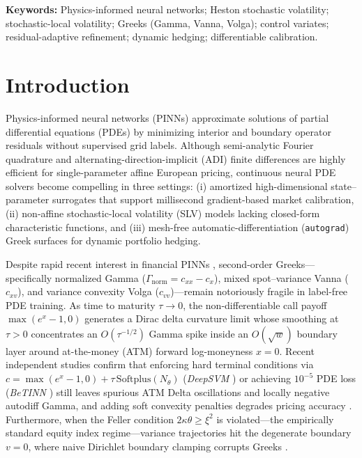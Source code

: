 \documentclass[11pt,a4paper]{article}
\begin{document}
\begin{abstract}
with parity-grade out-of-sample accuracy and tracks Exact Fourier dynamic hedging within $\$0.44$ across $1{,}200$ market-marked WRDS contract-days where baseline \texttt{B0} destabilizes hedging completely.
\end{abstract}

\noindent\textbf{Keywords:} Physics-informed neural networks; Heston stochastic volatility; stochastic-local volatility; Greeks (Gamma, Vanna, Volga); control variates; residual-adaptive refinement; dynamic hedging; differentiable calibration.

\section{Introduction}
\label{sec:intro}

Physics-informed neural networks (PINNs) \cite{raissi2019physics,lu2021deepxde} approximate solutions of partial differential equations (PDEs) by minimizing interior and boundary operator residuals without supervised grid labels. Although semi-analytic Fourier quadrature \cite{heston1993closed,lewis2000option,albrecher2007little} and alternating-direction-implicit (ADI) finite differences \cite{inthout2010adi} are highly efficient for single-parameter affine European pricing, continuous neural PDE solvers become compelling in three settings: (i) amortized high-dimensional state--parameter surrogates that support millisecond gradient-based market calibration, (ii) non-affine stochastic-local volatility (SLV) models \cite{ren2007calibrating} lacking closed-form characteristic functions, and (iii) mesh-free automatic-differentiation (\texttt{autograd}) Greek surfaces for dynamic portfolio hedging.

Despite rapid recent interest in financial PINNs \cite{hainaut2024option,hsu2024accurate,chakhoyan2025deepsvm,tan2026icpinns,sakuma2026dml,lararangel2026betinn,georgoulis2026deep,feng2026fideeponet}, second-order Greeks---specifically normalized Gamma ($\Gamma_{\mathrm{norm}} = c_{xx} - c_x$), mixed spot--variance Vanna ($c_{xv}$), and variance convexity Volga ($c_{vv}$)---remain notoriously fragile in label-free PDE training. As time to maturity $\tau \to 0$, the non-differentiable call payoff $\max(e^x - 1, 0)$ generates a Dirac delta curvature limit whose smoothing at $\tau > 0$ concentrates an $O(\tau^{-1/2})$ Gamma spike inside an $O(\sqrt{w})$ boundary layer around at-the-money (ATM) forward log-moneyness $x = 0$. Recent independent studies confirm that enforcing hard terminal conditions via $c = \max(e^x - 1, 0) + \tau\,\mathrm{Softplus}(N_\theta)$ (\emph{DeepSVM} \cite{chakhoyan2025deepsvm}) or achieving $10^{-5}$ PDE loss (\emph{BeTINN} \cite{lararangel2026betinn}) still leaves spurious ATM Delta oscillations and locally negative autodiff Gamma, and adding soft convexity penalties degrades pricing accuracy \cite{chakhoyan2025deepsvm}. Furthermore, when the Feller condition $2\kappa\theta \ge \xi^2$ is violated---the empirically standard equity index regime---variance trajectories hit the degenerate boundary $v = 0$, where naive Dirichlet boundary clamping corrupts Greeks \cite{ekstrom2010black}.
\end{document}
